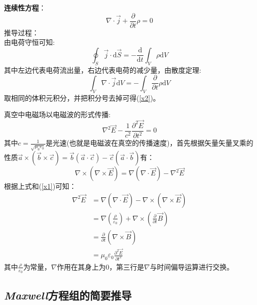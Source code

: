 \documentclass[12pt]{article}
\begin{document}
\textbf{连续性方程}：
\begin{equation}
    \nabla\cdot\Vec{j}+\frac{\partial}{\partial t}\rho=0
    \label{x2}
\end{equation}
推导过程：\\
      由电荷守恒可知:
      \begin{equation}
            \oint_S \Vec{j}\cdot \mathrm{d}\Vec{S}=-\frac{\mathrm{d}}{\mathrm{d}t}\int_V \rho \mathrm{d}V
      \end{equation}
        其中左边代表电荷流出量，右边代表电荷的减少量，由散度定理:
        \begin{equation}
            \int_V \nabla\cdot \Vec{j}\mathrm{d}V=-\int_V \frac{\partial}{\partial t}\rho \mathrm{d}V
        \end{equation}
        取相同的体积元积分，并把积分号去掉可得(\ref{x2})。
        
真空中电磁场以电磁波的形式传播:
\begin{equation}
    \nabla^2 \Vec{E}-\frac{1}{c^2}\frac{\partial^2 \Vec{E}}{\partial t^2}=0\label{x11}
\end{equation}
其中$c=\frac{1}{\sqrt{\mu_0\varepsilon_0}}$是光速(也就是电磁波在真空的传播速度)，首先根据矢量矢量叉乘的性质$\Vec{a}\times (\Vec{b}\times\Vec{c})=\Vec{b}(\Vec{a}\cdot\Vec{c})-\Vec{c}(\Vec{a}\cdot\Vec{b})$有：
\begin{equation}
\nabla\times(\nabla\times\Vec{E})=\nabla(\nabla\cdot\Vec{E})-\nabla^2\Vec{E}
\end{equation}
根据上式和(\ref{x1})可知：
\begin{equation}
    \begin{split}
        \nabla^2\Vec{E}&=\nabla(\nabla\cdot\Vec{E})-\nabla\times(\nabla \times\Vec{E})\\
    &=\nabla(\frac{\rho}{\varepsilon_0})+\nabla\times(\frac{\partial }{\partial t}\Vec{B})\\
    &=\frac{\partial}{\partial t}(\nabla\times \Vec{B})\\
    &=\mu_0\varepsilon_0\frac{\partial^2 \Vec{E}}{\partial t^2}
    \end{split}
\end{equation}
其中$\frac{\rho}{\varepsilon_0}$为常量，$\nabla$作用在其身上为0，第三行是$\nabla$与时间偏导运算进行交换。
\subsection{\textit{Maxwell}方程组的简要推导}
\end{document}
